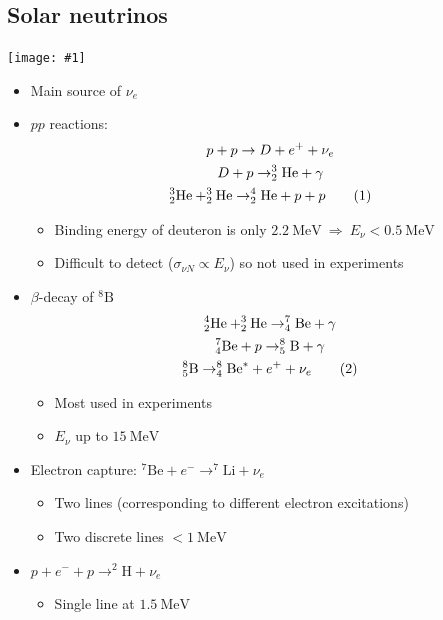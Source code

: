 \documentclass[11pt]{article}
\newcommand\numberthis{\addtocounter{equation}{1}\tag{\theequation}}
\newcommand{\mev}{\text{MeV}}
\newcommand{\el}{\ensuremath{e^{-}}\xspace}
\newcommand{\pos}{\ensuremath{e^{+}}\xspace}
\newcommand{\thus}{\ensuremath{~\Rightarrow~}}
\newcommand{\embedimgw}[2]{\begin{center}\texttt{[image: \#1]}\end{center}}
\begin{document}
\subsection{Solar neutrinos}
\embedimgw{figs/solarnu.png}{.6}
\begin{itemize}
  \item Main source of $\nu_e$
  \item $pp$ reactions:
  \begin{gather*}
    p+p\rightarrow D + \pos +\nu_e \\
    D+p\rightarrow _2^3\text{He} + \gamma \\
    _2^3\text{He}+_2^3\text{He}\rightarrow _2^4\text{He}+p+p \numberthis
  \end{gather*}
  \begin{itemize}
    \item Binding energy of deuteron is only $2.2~\mev$\thus $E_\nu < 0.5 ~\mev$
    \item Difficult to detect ($\sigma_{\nu N} \propto E_\nu$) so not used in experiments
  \end{itemize}
  \item $\beta$-decay of $^8\text{B}$
  \begin{gather*}
    ^4_2\text{He}+^3_2\text{He}\rightarrow_4^7\text{Be}+\gamma\\
    _4^7\text{Be}+p\rightarrow_5^8\text{B}+\gamma\\
    _5^8\text{B}\rightarrow_4^8\text{Be}^*+\pos+\nu_e\numberthis
  \end{gather*}
  \begin{itemize}
    \item Most used in experiments
    \item $E_\nu$ up to $15~\mev$
  \end{itemize}
  \item Electron capture: $^7\text{Be}+\el \rightarrow ^7\text{Li}+\nu_e$
  \begin{itemize}
    \item Two lines (corresponding to different electron excitations)
    \item Two discrete lines $<1~\mev$
  \end{itemize}
  \item $p+\el+p\rightarrow ^2\text{H}+\nu_e$
  \begin{itemize}
    \item Single line at $1.5~\mev$
  \end{itemize}
\end{itemize}
\end{document}
